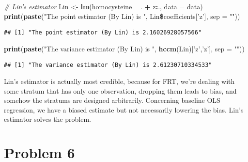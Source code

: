 \documentclass[]{article}
\newenvironment{Shaded}{\begin{snugshade}}{\end{snugshade}}
\newcommand{\KeywordTok}[1]{\textcolor[rgb]{0.13,0.29,0.53}{\textbf{#1}}}
\newcommand{\DataTypeTok}[1]{\textcolor[rgb]{0.13,0.29,0.53}{#1}}
\newcommand{\StringTok}[1]{\textcolor[rgb]{0.31,0.60,0.02}{#1}}
\newcommand{\CommentTok}[1]{\textcolor[rgb]{0.56,0.35,0.01}{\textit{#1}}}
\newcommand{\OperatorTok}[1]{\textcolor[rgb]{0.81,0.36,0.00}{\textbf{#1}}}
\newcommand{\NormalTok}[1]{#1}
\begin{document}
\begin{Shaded}
\begin{Highlighting}[]
\CommentTok{# Lin's estimator}
\NormalTok{Lin <-}\StringTok{ }\KeywordTok{lm}\NormalTok{(homocysteine }\OperatorTok{~}\StringTok{ }\NormalTok{. }\OperatorTok{+}\StringTok{ }\NormalTok{z}\OperatorTok{:}\NormalTok{., }\DataTypeTok{data =}\NormalTok{ data)}
\KeywordTok{print}\NormalTok{(}\KeywordTok{paste}\NormalTok{(}\StringTok{"The point estimator (By Lin) is "}\NormalTok{, Lin}\OperatorTok{\$}\NormalTok{coefficients[}\StringTok{'z'}\NormalTok{], }\DataTypeTok{sep =} \StringTok{""}\NormalTok{))}
\end{Highlighting}
\end{Shaded}

\begin{verbatim}
## [1] "The point estimator (By Lin) is 2.16026928057566"
\end{verbatim}

\begin{Shaded}
\begin{Highlighting}[]
\KeywordTok{print}\NormalTok{(}\KeywordTok{paste}\NormalTok{(}\StringTok{"The variance estimator (By Lin) is "}\NormalTok{, }\KeywordTok{hccm}\NormalTok{(Lin)[}\StringTok{'z'}\NormalTok{,}\StringTok{'z'}\NormalTok{], }\DataTypeTok{sep =} \StringTok{""}\NormalTok{))}
\end{Highlighting}
\end{Shaded}

\begin{verbatim}
## [1] "The variance estimator (By Lin) is 2.61230710334533"
\end{verbatim}

Lin's estimator is actually most credible, because for FRT, we're
dealing with some stratum that has only one observation, dropping them
leads to bias, and somehow the stratums are designed arbitrarily.
Concerning baseline OLS regression, we have a biased estimate but not
necessarily lowering the bias. Lin's estimator solves the problem.

\section*{Problem 6}
\end{document}
